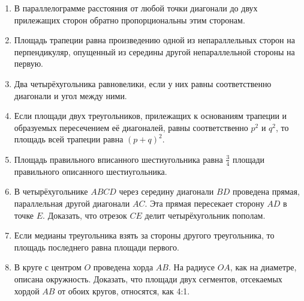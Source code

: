 \documentclass[oneside]{book}
\begin{document}
\begin{enumerate}
 \item
В параллелограмме расстояния от любой точки диагонали до двух прилежащих сторон обратно пропорциональны этим сторонам.

 \item
Площадь трапеции равна произведению одной из непараллельных сторон на перпендикуляр, опущенный из середины другой непараллельной стороны на первую.

 \item
Два четырёхугольника равновелики, если у них равны соответственно диагонали и угол между ними.

 \item
Если площади двух треугольников, прилежащих к основаниям трапеции и образуемых пересечением её диагоналей, равны соответственно $p^2$ и $q^2$, то площадь всей трапеции равна $(p+q)^2$.

 \item
Площадь правильного вписанного шестиугольника равна $\tfrac34$ площади правильного описанного шестиугольника.

 \item
В четырёхугольнике $ABCD$ через середину диагонали $BD$ проведена прямая, параллельная другой диагонали $AC$.
Эта прямая пересекает сторону $AD$ в точке $E$.
Доказать, что отрезок $CE$ делит четырёхугольник пополам.

 \item
Если медианы треугольника взять за стороны другого треугольника, то площадь последнего равна площади первого.

 \item
В круге с центром $O$ проведена хорда $AB$.
На радиусе $OA$, как на диаметре, описана окружность.
Доказать, что площади двух сегментов, отсекаемых хордой $AB$ от обоих кругов, относятся, как 4:1.


\end{enumerate}

\begin{center}
\end{center}
\end{document}
